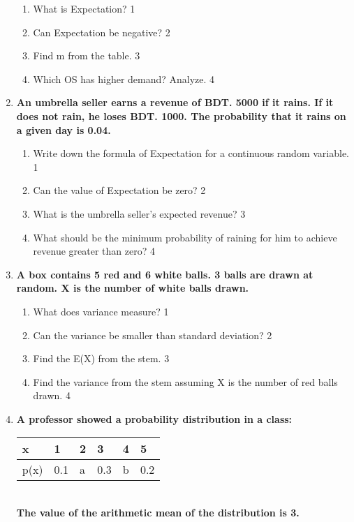 \documentclass[a4paper,oneside, margin=1.4in]{book}
\begin{document}
\begin{enumerate}
  \begin{enumerate}
    \item
	What is Expectation? \hfill 1
    \item
	Can Expectation be negative? \hfill 2
    \item  
	Find m from the table. \hfill 3
    \item
	Which OS has higher demand? Analyze. \hfill 4
  \end{enumerate}

\item
	  \textbf{An umbrella seller earns a revenue of BDT. 5000 if it rains. If it does not rain, he loses BDT. 1000. The probability that it rains on a given day is 0.04.} 
  
  \begin{enumerate}
    \item
	Write down the formula of Expectation for a continuous random variable. \hfill 1
    \item
	Can the value of Expectation be zero? \hfill 2
    \item  
	What is the umbrella seller's expected revenue? \hfill 3
    \item
	What should be the minimum probability of raining for him to achieve revenue greater than zero? \hfill 4
  \end{enumerate}
  
     \item
	  \textbf{A box contains 5 red and 6 white balls. 3 balls are drawn at random. X is the number of white balls drawn.} 
  
  \begin{enumerate}
    \item
	What does variance measure? \hfill 1
    \item
	Can the variance be smaller than standard deviation? \hfill 2
    \item  
	Find the E(X) from the stem. \hfill 3
    \item
	Find the variance from the stem assuming X is the number of red balls drawn. \hfill 4
  \end{enumerate}
  
   \item
	  \textbf{A professor showed a probability distribution in a class:}
	  
	  \begin{table}[h]
	  \begin{center}
\begin{tabular}{llllll}
x    & 1   & 2 & 3   & 4 & 5   \\ \hline
p(x) & 0.1 & a & 0.3 & b & 0.2 
\end{tabular} \\
\textbf{The value of the arithmetic mean of the distribution is 3.}
\end{center}	
\end{table}
    

\end{enumerate}
\end{document}
